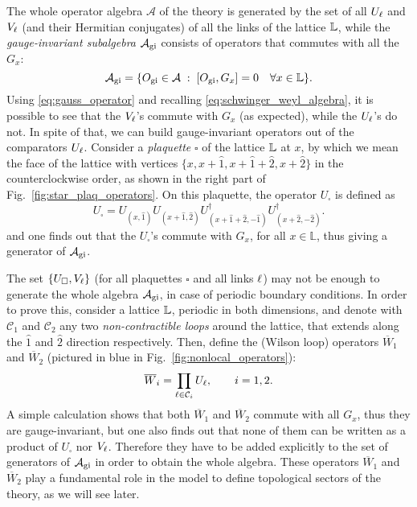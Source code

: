 The whole operator algebra $\mathcal{A}$ of the theory is generated by the set of all $U_\ell$ and $V_\ell$ (and their Hermitian conjugates) of all the links of the lattice $\mathbb{L}$, while
the  \emph{gauge-invariant subalgebra} $\mathcal{A}_{\text{gi}}$ consists of operators that commutes with all the $G_x$:
\begin{equation}
    \mathcal{A}_{\text{gi}} = \{ O_{\text{gi}} \in \mathcal{A} \;:\; [O_{\text{gi}}, G_x] = 0 \quad \forall x \in \mathbb{L} \}.
\end{equation}
Using \eqref{eq:gauss_operator} and recalling \eqref{eq:schwinger_weyl_algebra}, it is possible to see that the $V_\ell$'s commute with $G_x$ (as expected), while the $U_\ell$'s do not.
In spite of that, we can build gauge-invariant operators out of the comparators $U_\ell$.
Consider a \emph{plaquette} $\square$ of the lattice $\mathbb{L}$ at $x$, by which we mean the face of the lattice with vertices $\{x, x+\hat{1}, x+\hat{1}+\hat{2}, x+\hat{2}\}$ in the counterclockwise order, as shown in the right part of Fig.~\ref{fig:star_plaq_operators}.
On this plaquette, the operator $U_{\square}$ is defined as
\begin{equation}
    U_{\square} =
    U_{(x, \hat{1})}
    U_{(x + \hat{1}, \hat{2})}
    U_{(x + \hat{1} + \hat{2}, -\hat{1})}^\dagger
    U_{(x + \hat{2}, -\hat{2})}^\dagger.
    \label{eq:plaq_operator}
\end{equation}
and one finds out that the $U_{\square}$'s commute with $G_x$, for all $x\in \mathbb L$, thus giving a generator of $\mathcal{A}_{\text{gi}}$.

The set $\{U_{\square}, V_\ell\}$ (for all plaquettes $\square$ and all links $\ell$) may not be enough to generate the whole algebra $\mathcal{A}_{\text{gi}}$, in case of periodic boundary conditions.
In order to prove this, consider a lattice $\mathbb{L}$, periodic in both dimensions, and denote with $\mathcal{C}_1$ and $\mathcal{C}_2$  any two \emph{non-contractible loops} around the lattice, that extends along the $\hat{1}$ and $\hat{2}$ direction respectively.
Then, define the (Wilson loop) operators $\overline{W}_1$ and $\overline{W}_2$ (pictured in blue in Fig.~\ref{fig:nonlocal_operators}):
\begin{equation}
    \overline{W}_i = \prod_{\ell \in \mathcal{C}_i} U_\ell, \qquad i=1,2.
    \label{eq:top_wilson_loop}
\end{equation}
A simple calculation shows that both $\overline{W}_1$ and $\overline{W}_2$ commute with all $G_x$, thus they are gauge-invariant, but one also finds out that none of them can be written as a product of $U_{\square}$ nor $V_\ell$.
Therefore they have to be added explicitly to the set of generators of $\mathcal{A}_{\text{gi}}$ in order to obtain the whole algebra.
These operators $\overline{W}_1$ and $\overline{W}_2$ play a fundamental role in the model to define topological sectors of the theory, as we will see later.

